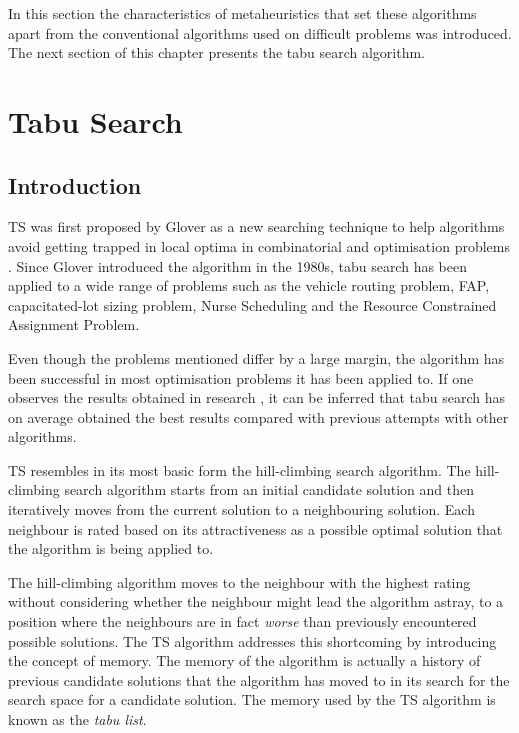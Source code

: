 In this section the characteristics of metaheuristics that set these algorithms apart from the conventional algorithms used on difficult problems was introduced. The next section of this chapter presents the tabu search algorithm.
\section{Tabu Search}
\label{sec:tabusearch}
\subsection{Introduction}
\label{sec:TSIntroduction}
\Gls{TS} was first proposed by Glover\cite{Glover89} as a new searching technique to help algorithms avoid getting trapped in local optima in combinatorial and optimisation problems \cite{TabuRCAProblem}. Since Glover introduced the algorithm in the 1980s, tabu search has been applied to a wide range of problems such as the vehicle routing problem\cite{TabuVechicleRoutingWithTimeWindows}, \gls{FAP}\cite{TabuMontemanniSmith}, capacitated-lot sizing problem\cite{TabuCarryOver}, Nurse Scheduling\cite{TabuNurse} and the Resource Constrained Assignment Problem\cite{TabuRCAProblem}. 

Even though the problems mentioned differ by a large margin, the algorithm has been successful in most optimisation problems it has been applied to. If one observes the results obtained in research \cite{TabuMontemanniSmith,tabuglobalplanning3g}, it can be inferred that tabu search has on average obtained the best results compared with previous attempts with other algorithms. 

\Gls{TS} resembles in its most basic form the hill-climbing search algorithm\cite{TabuBiddingStrats}. The hill-climbing search algorithm starts from an initial candidate solution and then iteratively moves from the current solution to a neighbouring solution\cite{AIModernApproach}. Each neighbour is rated based on its attractiveness as a possible optimal solution that the algorithm is being applied to\cite{AIModernApproach}. 

The hill-climbing algorithm moves to the neighbour with the highest rating without considering whether the neighbour might lead the algorithm astray, to a position where the neighbours are in fact \emph{worse} than previously encountered possible solutions\cite{AIModernApproach}. 
The \gls{TS} algorithm addresses this shortcoming by introducing the concept of memory\cite{TabuBiddingStrats}. The memory of the algorithm is actually a history of previous candidate solutions that the algorithm has moved to in its search for the search space for a candidate solution\cite{TabuBiddingStrats}. The memory used by the \gls{TS} algorithm is known as the \emph{tabu list}.

